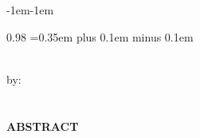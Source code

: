 \clearpage
{}
{}

\begin{adjustwidth}{-1em}{-1em} %
    \begin{spacing}{0.98} %
        \begingroup
        \spaceskip=0.35em plus 0.1em minus 0.1em %
        \setlength{\parindent}{2em} %
        \setlength{\parskip}{0.5em} %

        \begin{center}
            \textbf{\large{\judulen}}\\[0.5cm]
            by:\\
            \penulis\\
            \nim\\[2em]
            \textbf{ABSTRACT}\\[0.5cm]
        \end{center}


\end{spacing}
\end{adjustwidth}
